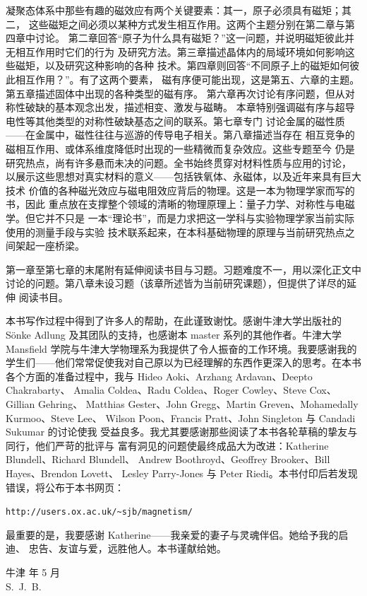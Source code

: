 凝聚态体系中那些有趣的磁效应有两个关键要素：其一，原子必须具有磁矩；其二，
这些磁矩之间必须以某种方式发生相互作用。这两个主题分别在第二章与第四章中讨论。
第二章回答“原子为什么具有磁矩？”这一问题，并说明磁矩彼此并无相互作用时它们的行为
及研究方法。第三章描述晶体内的局域环境如何影响这些磁矩，以及研究这种影响的各种
技术。第四章则回答“不同原子上的磁矩如何彼此相互作用？”。有了这两个要素，
磁有序便可能出现，这是第五、六章的主题。第五章描述固体中出现的各种类型的磁有序。
第六章再次讨论有序问题，但从对称性破缺的基本观念出发，描述相变、激发与磁畴。
本章特别强调磁有序与超导电性等其他类型的对称性破缺基态之间的联系。第七章专门
讨论金属的磁性质——在金属中，磁性往往与巡游的传导电子相关。第八章描述当存在
相互竞争的磁相互作用、或体系维度降低时出现的一些精微而复杂效应。这些专题至今
仍是研究热点，尚有许多悬而未决的问题。全书始终贯穿对材料性质与应用的讨论，
以展示这些思想对真实材料的意义——包括铁氧体、永磁体，以及近年来具有巨大技术
价值的各种磁光效应与磁电阻效应背后的物理。这是一本为物理学家而写的书，因此
重点放在支撑整个领域的清晰的物理原理上：量子力学、对称性与电磁学。但它并不只是
一本“理论书”，而是力求把这一学科与实验物理学家当前实际使用的测量手段与实验
技术联系起来，在本科基础物理的原理与当前研究热点之间架起一座桥梁。

第一章至第七章的末尾附有延伸阅读书目与习题。习题难度不一，用以深化正文中
讨论的问题。第八章未设习题（该章所述皆为当前研究课题），但提供了详尽的延伸
阅读书目。

本书写作过程中得到了许多人的帮助，在此谨致谢忱。感谢牛津大学出版社的
Sönke Adlung 及其团队的支持，也感谢本 master 系列的其他作者。牛津大学
Mansfield 学院与牛津大学物理系为我提供了令人振奋的工作环境。我要感谢我的
学生们——他们常常促使我对自己原以为已经理解的东西作更深入的思考。在本书
各个方面的准备过程中，我与 Hideo Aoki、Arzhang Ardavan、Deepto Chakrabarty、
Amalia Coldea、Radu Coldea、Roger Cowley、Steve Cox、Gillian Gehring、
Matthias Gester、John Gregg、Martin Greven、Mohamedally Kurmoo、Steve Lee、
Wilson Poon、Francis Pratt、John Singleton 与 Candadi Sukumar 的讨论使我
受益良多。我尤其要感谢那些阅读了本书各轮草稿的挚友与同行，他们严苛的批评与
富有洞见的问题使最终成品大为改进：Katherine Blundell、Richard Blundell、
Andrew Boothroyd、Geoffrey Brooker、Bill Hayes、Brendon Lovett、
Lesley Parry-Jones 与 Peter Riedi。本书付印后若发现错误，将公布于本书网页：
\begin{center}
\texttt{http://users.ox.ac.uk/\textasciitilde sjb/magnetism/}
\end{center}

最重要的是，我要感谢 Katherine——我亲爱的妻子与灵魂伴侣。她给予我的启迪、
忠告、友谊与爱，远胜他人。本书谨献给她。

\begin{flushright}
牛津 年 5 月\\
S.~J.~B.
\end{flushright}

\clearpage
